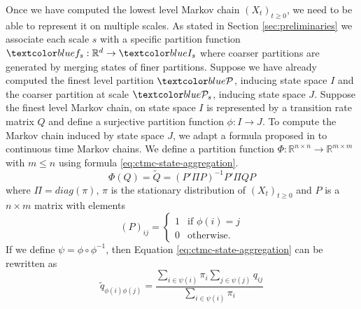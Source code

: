 Once we have computed the lowest level Markov chain $(X_t)_{t \ge 0}$, we need to be able to represent it on multiple scales.
As stated in Section \ref{sec:preliminaries} we associate each scale $s$ with a specific partition function
$\lstopar{f_s}: \mathbb{R}^d \rightarrow \lstopar{I_s}$ where coarser partitions are generated by merging 
states of finer partitions.
Suppose we have already computed the finest level partition $\lstopar{\cP}$, inducing state space $I$ and the
coarser partition at scale $\lstopar{\cP_s}$, inducing state space $J$. Suppose the finest level Markov chain,
on state space $I$ is represented by a transition rate matrix $Q$ and define a surjective partition function
$\phi: I \rightarrow J$. To compute the Markov chain induced by state space $J$, we adapt a formula proposed
in \cite{5746509} to continuous time Markov chains. We define a partition function
$\Phi: \mathbb{R}^{n \times n} \rightarrow \mathbb{R}^{m \times m}$ with $m \le n$ using formula \ref{eq:ctmc-state-aggregation}.
\begin{equation}
	\label{eq:ctmc-state-aggregation}
	\Phi(Q) = \tilde{Q} = (P' \Pi P)^{-1} P' \Pi Q P
\end{equation}
where $\Pi = diag(\pi)$, $\pi$ is the stationary distribution of $(X_t)_{t \ge 0}$ and $P$ is a 
$n \times m$ matrix with elements
\begin{equation}
	\nonumber
	\left(P\right)_{ij} = 
		\left\{
			\begin{array}{ll}
				1 & \mbox{if } \phi(i) = j \\
				0 & \mbox{otherwise}.
			\end{array}
		\right.
\end{equation}
If we define $\psi = \phi \circ \phi^{-1}$, then Equation \ref{eq:ctmc-state-aggregation} can be rewritten as
\begin{equation}
	\nonumber
	\tilde{q}_{\phi(i)\phi(j)} = \frac{\sum\limits_{i \in \psi(i)}\pi_i \sum\limits_{j \in \psi(j)} q_{ij}}{\sum\limits_{i \in \psi(i)}\pi_i}
\end{equation}
\fi